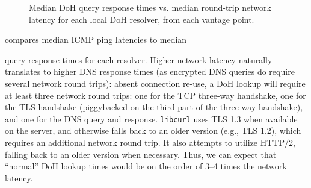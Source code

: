 \begin{figure}[t]
    \hspace*{-0.75in}
    \begin{minipage}{1.35\linewidth}
    \hfill
    \hfill
    \caption{Median DoH query response times vs. median round-trip network
    latency for each local DoH resolver, from each vantage point.}
    \label{fig:ping_qrt_scatters}
    \end{minipage}
\end{figure}

 compares median ICMP ping latencies to median 

query response times for each resolver.
Higher network latency naturally translates to higher DNS response
times (as encrypted DNS queries do require several network round trips):
absent connection re-use, a DoH lookup will require at least three network
round trips: one for the TCP three-way handshake, one for the TLS handshake
(piggybacked on the third part of the three-way handshake), and one for the
DNS query and response. {\tt libcurl} uses TLS 1.3 when available on the
server, and otherwise falls back to an older version (e.g., TLS 1.2), which requires an additional
network round trip.
It also attempts to utilize HTTP/2, falling back to an older version when necessary.
Thus, we can expect that ``normal'' DoH lookup times would
be on the order of 3--4 times the network latency.

